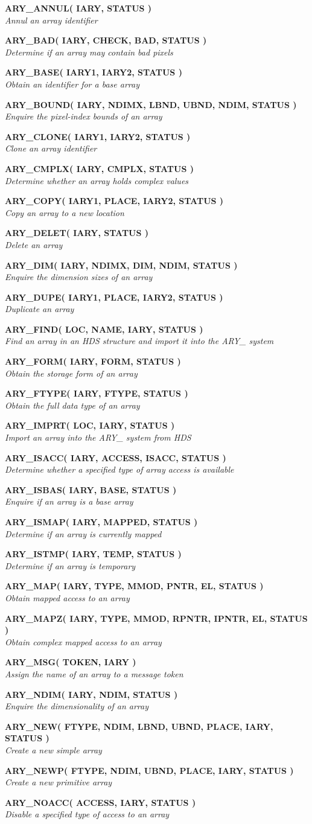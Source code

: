 \documentclass[twoside,11pt]{article}
\newcommand{\noteroutine}[2]{\textbf{#1}\hspace*{\fill}\nopagebreak \\
                             \hspace*{3em}\emph{#2}\hspace*{\fill}\par}
\begin{document}
\begin{eqn*}
\noteroutine{ARY\_ANNUL( IARY, STATUS )}
            {Annul an array identifier}
\noteroutine{ARY\_BAD( IARY, CHECK, BAD, STATUS )}
            {Determine if an array may contain bad pixels}
\noteroutine{ARY\_BASE( IARY1, IARY2, STATUS )}
            {Obtain an identifier for a base array}
\noteroutine{ARY\_BOUND( IARY, NDIMX, LBND, UBND, NDIM, STATUS )}
            {Enquire the pixel-index bounds of an array}
\noteroutine{ARY\_CLONE( IARY1, IARY2, STATUS )}
            {Clone an array identifier}
\noteroutine{ARY\_CMPLX( IARY, CMPLX, STATUS )}
            {Determine whether an array holds complex values}
\noteroutine{ARY\_COPY( IARY1, PLACE, IARY2, STATUS )}
            {Copy an array to a new location}
\noteroutine{ARY\_DELET( IARY, STATUS )}
            {Delete an array}
\noteroutine{ARY\_DIM( IARY, NDIMX, DIM, NDIM, STATUS )}
            {Enquire the dimension sizes of an array}
\noteroutine{ARY\_DUPE( IARY1, PLACE, IARY2, STATUS )}
            {Duplicate an array}
\noteroutine{ARY\_FIND( LOC, NAME, IARY, STATUS )}
            {Find an array in an HDS structure and import it into the ARY\_ system}
\noteroutine{ARY\_FORM( IARY, FORM, STATUS )}
            {Obtain the storage form of an array}
\noteroutine{ARY\_FTYPE( IARY, FTYPE, STATUS )}
            {Obtain the full data type of an array}
\noteroutine{ARY\_IMPRT( LOC, IARY, STATUS )}
            {Import an array into the ARY\_ system from HDS}
\noteroutine{ARY\_ISACC( IARY, ACCESS, ISACC, STATUS )}
            {Determine whether a specified type of array access is available}
\noteroutine{ARY\_ISBAS( IARY, BASE, STATUS )}
            {Enquire if an array is a base array}
\noteroutine{ARY\_ISMAP( IARY, MAPPED, STATUS )}
            {Determine if an array is currently mapped}
\noteroutine{ARY\_ISTMP( IARY, TEMP, STATUS )}
            {Determine if an array is temporary}
\noteroutine{ARY\_MAP( IARY, TYPE, MMOD, PNTR, EL, STATUS )}
            {Obtain mapped access to an array}
\noteroutine{ARY\_MAPZ( IARY, TYPE, MMOD, RPNTR, IPNTR, EL, STATUS )}
            {Obtain complex mapped access to an array}
\noteroutine{ARY\_MSG( TOKEN, IARY )}
            {Assign the name of an array to a message token}
\noteroutine{ARY\_NDIM( IARY, NDIM, STATUS )}
            {Enquire the dimensionality of an array}
\noteroutine{ARY\_NEW( FTYPE, NDIM, LBND, UBND, PLACE, IARY, STATUS )}
            {Create a new simple array}
\noteroutine{ARY\_NEWP( FTYPE, NDIM, UBND, PLACE, IARY, STATUS )}
            {Create a new primitive array}
\noteroutine{ARY\_NOACC( ACCESS, IARY, STATUS )}
            {Disable a specified type of access to an array}

\end{eqn*}
\end{document}
